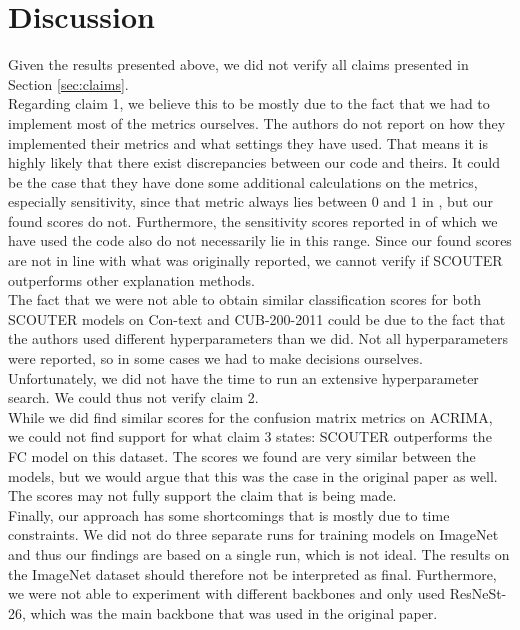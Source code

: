 \section{Discussion}
Given the results presented above, we did not verify all claims presented in Section \ref{sec:claims}.
\\
Regarding claim 1, we believe this to be mostly due to the fact that we had to implement most of the metrics ourselves. The authors do not report on how they implemented their metrics and what settings they have used. That means it is highly likely that there exist discrepancies between our code and theirs. It could be the case that they have done some additional calculations on the metrics, especially sensitivity, since that metric always lies between 0 and 1 in \cite{scouter}, but our found scores do not. Furthermore, the sensitivity scores reported in \cite{fidelity} of which we have used the code also do not necessarily lie in this range. Since our found scores are not in line with what was originally reported, we cannot verify if SCOUTER outperforms other explanation methods.
\\
The fact that we were not able to obtain similar classification scores for both SCOUTER models on Con-text and CUB-200-2011 could be due to the fact that the authors used different hyperparameters than we did. Not all hyperparameters were reported, so in some cases we had to make decisions ourselves. Unfortunately, we did not have the time to run an extensive hyperparameter search. We could thus not verify claim 2.
\\
While we did find similar scores for the confusion matrix metrics on ACRIMA, we could not find support for what claim 3 states: SCOUTER outperforms the FC model on this dataset. The scores we found are very similar between the models, but we would argue that this was the case in the original paper as well. The scores may not fully support the claim that is being made.
\\
Finally, our approach has some shortcomings that is mostly due to time constraints. We did not do three separate runs for training models on ImageNet and thus our findings are based on a single run, which is not ideal. The results on the ImageNet dataset should therefore not be interpreted as final. Furthermore, we were not able to experiment with different backbones and only used ResNeSt-26, which was the main backbone that was used in the original paper.

